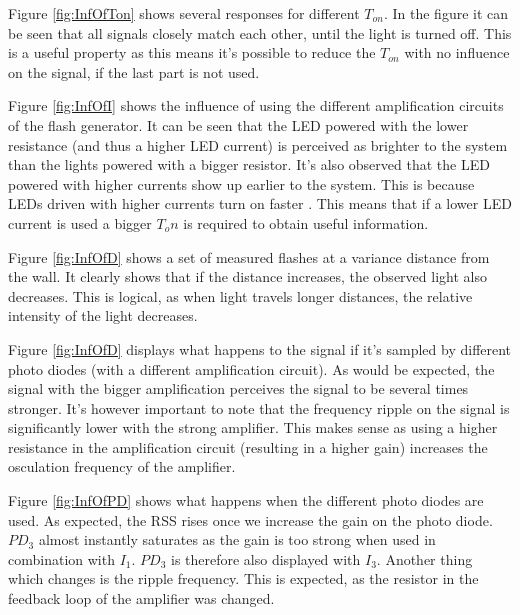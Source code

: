 Figure \ref{fig:InfOfTon} shows several responses for different $T_{on}$. In the figure it can be seen that all signals closely match each other, until the light is turned off. This is a useful property as this means it's possible to reduce the $T_{on}$ with no influence on the signal, if the last part is not used.

Figure \ref{fig:InfOfI} shows the influence of using the different amplification circuits of the flash generator. It can be seen that the LED powered with the lower resistance (and thus a higher LED current) is perceived as brighter to the system than the lights powered with a bigger resistor. It's also observed that the LED powered with higher currents show up earlier to the system. This is because LEDs driven with higher currents turn on faster \cite{LED_on}. This means that if a lower LED current is used a bigger $T_on$ is required to obtain useful information.

Figure \ref{fig:InfOfD} shows a set of measured flashes at a variance distance from the wall. It clearly shows that if the distance increases, the observed light also decreases. This is logical, as when light travels longer distances, the relative intensity of the light decreases. 

Figure \ref{fig:InfOfD} displays what happens to the signal if it's sampled by different photo diodes (with a different amplification circuit). As would be expected, the signal with the bigger amplification perceives the signal to be several times stronger. It's however important to note that the frequency ripple on the signal is significantly lower with the strong amplifier. This makes sense as using a higher resistance in the amplification circuit (resulting in a higher gain) increases the osculation frequency of the amplifier.

Figure \ref{fig:InfOfPD} shows what happens when the different photo diodes are used. As expected, the RSS rises once we increase the gain on the photo diode. $PD_3$ almost instantly saturates as the gain is too strong when used in combination with $I_1$. $PD_3$ is therefore also displayed with $I_3$. Another thing which changes is the ripple frequency. This is expected, as the resistor in the feedback loop of the amplifier was changed.


